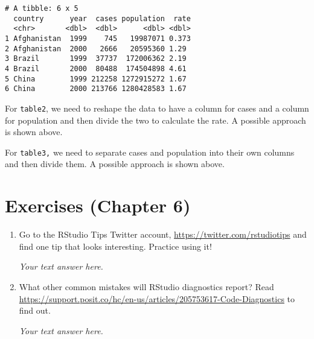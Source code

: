 \documentclass[
  letterpaper,
  DIV=11,
  numbers=noendperiod]{scrreprt}
\begin{document}
\begin{enumerate}
\begin{tcolorbox}
\begin{verbatim}
# A tibble: 6 x 5
  country      year  cases population  rate
  <chr>       <dbl>  <dbl>      <dbl> <dbl>
1 Afghanistan  1999    745   19987071 0.373
2 Afghanistan  2000   2666   20595360 1.29 
3 Brazil       1999  37737  172006362 2.19 
4 Brazil       2000  80488  174504898 4.61 
5 China        1999 212258 1272915272 1.67 
6 China        2000 213766 1280428583 1.67 
\end{verbatim}

  For \texttt{table2}, we need to reshape the data to have a column for
  cases and a column for population and then divide the two to calculate
  the rate. A possible approach is shown above.

  For \texttt{table3,} we need to separate cases and population into
  their own columns and then divide them. A possible approach is shown
  above.

  \end{tcolorbox}
\end{enumerate}


\hypertarget{exercises-chapter-6}{%
\chapter{Exercises (Chapter 6)}\label{exercises-chapter-6}}

\begin{enumerate}
\def\labelenumi{\arabic{enumi}.}
\item
  Go to the RStudio Tips Twitter account,
  \url{https://twitter.com/rstudiotips} and find one tip that looks
  interesting. Practice using it!

  \begin{tcolorbox}[enhanced jigsaw, breakable, bottomtitle=1mm, left=2mm, colback=white, toprule=.15mm, leftrule=.75mm, colframe=quarto-callout-note-color-frame, colbacktitle=quarto-callout-note-color!10!white, title={Answer}, coltitle=black, toptitle=1mm, bottomrule=.15mm, opacitybacktitle=0.6, arc=.35mm, rightrule=.15mm, titlerule=0mm, opacityback=0]

  \emph{Your text answer here.}

  \end{tcolorbox}
\item
  What other common mistakes will RStudio diagnostics report? Read
  \url{https://support.posit.co/hc/en-us/articles/205753617-Code-Diagnostics}
  to find out.

  \begin{tcolorbox}[enhanced jigsaw, breakable, bottomtitle=1mm, left=2mm, colback=white, toprule=.15mm, leftrule=.75mm, colframe=quarto-callout-note-color-frame, colbacktitle=quarto-callout-note-color!10!white, title={Answer}, coltitle=black, toptitle=1mm, bottomrule=.15mm, opacitybacktitle=0.6, arc=.35mm, rightrule=.15mm, titlerule=0mm, opacityback=0]

  \emph{Your text answer here.}

  \end{tcolorbox}
\end{enumerate}
\end{document}
